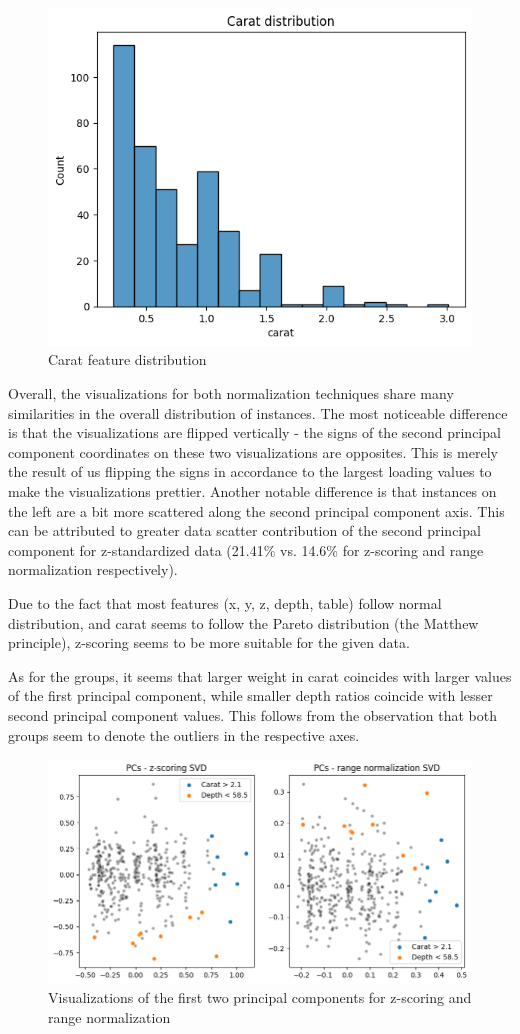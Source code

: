 \documentclass[12pt,a4paper]{article}
\begin{document}
	\begin{figure}[hbtp]
		\centering
		\includegraphics[width=.5\textwidth]{media/caratDist.png}
		\caption{Carat feature distribution}
		\label{fig:caratDist}
	\end{figure}
	
	Overall, the visualizations for both normalization techniques share many similarities in the overall distribution of instances. The most noticeable difference is that the visualizations are flipped vertically - the signs of the second principal component coordinates on these two visualizations are opposites. This is merely the result of us flipping the signs in accordance to the largest loading values to make the visualizations prettier. Another notable difference is that instances on the left are a bit more scattered along the second principal component axis. This can be attributed to greater data scatter contribution of the second principal component for z-standardized data (21.41\% vs. 14.6\% for z-scoring and range normalization respectively).
	
	Due to the fact that most features (x, y, z, depth, table) follow normal distribution, and carat seems to follow the Pareto distribution (the Matthew principle), z-scoring seems to be more suitable for the given data.
	
	As for the groups, it seems that larger weight in carat coincides with larger values of the first principal component, while smaller depth ratios coincide with lesser second principal component values. This follows from the observation that both groups seem to denote the outliers in the respective axes.
	
	\begin{figure}[hbtp]
		\centering
		\includegraphics[width=.7\textwidth]{media/pcaComp.png}
		\caption{Visualizations of the first two principal components for z-scoring and range normalization}
		\label{fig:pcaComp}
	\end{figure}
	
\end{document}
